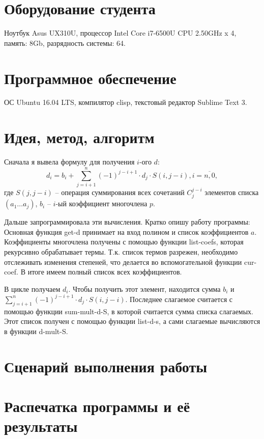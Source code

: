 \documentclass[12pt]{article}
\begin{document}
\section{Оборудование студента}
Ноутбук Asus UX310U, процессор Intel Core i7-6500U CPU 2.50GHz x 4, память: 8Gb, разрядность системы: 64.

\section{Программное обеспечение}
ОС Ubuntu 16.04 LTS, компилятор clisp, текстовый редактор Sublime Text 3.

\section{Идея, метод, алгоритм}

Сначала я вывела формулу для получения $i$-ого $d$:
$$ d_{i} = b_{i} + \sum_{j=i+1}^n (-1)^{j - i + 1} \cdot d_{j}\cdot S(i, j - i), i = \overline{n,0},$$
где $S(j, j - i)$ -- операция суммирования всех сочетаний $C_{j}^{j - i}$ элементов списка $(a_{1} \ldots a_{j})$,
$b_i$ -- $i$-ый коэффициент многочлена $p$.

Дальше запрограммировала эти вычисления. Кратко опишу работу программы:\\
Основная функция get-d принимает на вход полином и список коэффициентов $a$. Коэффициенты многочлена получены с помощью функции list-coefs, которая рекурсивно обрабатывает термы. Т.к. список термов разрежен, необходимо отслеживать изменения степеней, что делается во вспомогательной функции cur-coef. В итоге имеем полный список всех коэффициентов.\par
В цикле получаем $d_{i}$. Чтобы получить этот элемент, находится сумма $b_{i}$ и $\sum_{j=i+1}^n (-1)^{j - i + 1} \cdot d_{j}\cdot S(i, j - i)$. Последнее слагаемое считается с помощью функции sum-mult-d-S, в которой считается сумма списка слагаемых. Этот список получен с помощью функции list-d-s, а сами слагаемые вычисляются в функции d-mult-S. 

\section{Сценарий выполнения работы}

\section{Распечатка программы и её результаты}
\end{document}
